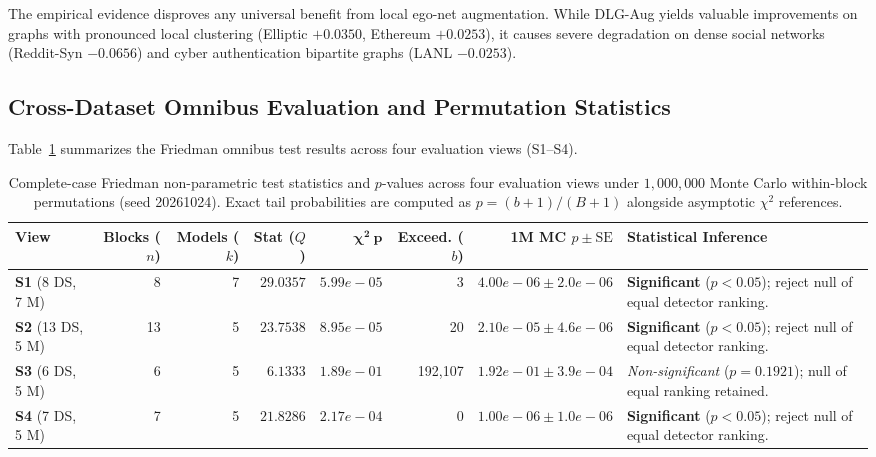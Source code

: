 \documentclass[applsci,article,submit,moreauthors,pdftex]{Definitions/mdpi}
\begin{document}
The empirical evidence disproves any universal benefit from local ego-net augmentation. While DLG-Aug yields valuable improvements on graphs with pronounced local clustering (Elliptic $+0.0350$, Ethereum $+0.0253$), it causes severe degradation on dense social networks (Reddit-Syn $-0.0656$) and cyber authentication bipartite graphs (LANL $-0.0253$).

\subsection{Cross-Dataset Omnibus Evaluation and Permutation Statistics}
Table~\ref{tab:friedman_stats} summarizes the Friedman omnibus test results across four evaluation views (S1--S4).

\begin{table}[htbp]
\centering\footnotesize\setlength{\tabcolsep}{3.0pt}
\caption{Complete-case Friedman non-parametric test statistics and $p$-values across four evaluation views under $1{,}000{,}000$ Monte Carlo within-block permutations (seed 20261024). Exact tail probabilities are computed as $p = (b+1)/(B+1)$ alongside asymptotic $\chi^2$ references.}
\label{tab:friedman_stats}
\begin{tabularx}{\textwidth}{lrrrrrr>{\raggedright\arraybackslash}X}\toprule
\textbf{View} & \textbf{Blocks ($n$)} & \textbf{Models ($k$)} & \textbf{Stat ($Q$)} & $\mathbf{\chi^2\ p}$ & \textbf{Exceed. ($b$)} & \textbf{1M MC $p \pm \text{SE}$} & \textbf{Statistical Inference} \\\midrule
\textbf{S1} (8 DS, 7 M) & 8 & 7 & $29.0357$ & $5.99e-05$ & 3 & $4.00e-06 \pm 2.0e-06$ & \textbf{Significant} ($p < 0.05$); reject null of equal detector ranking. \\
\textbf{S2} (13 DS, 5 M) & 13 & 5 & $23.7538$ & $8.95e-05$ & 20 & $2.10e-05 \pm 4.6e-06$ & \textbf{Significant} ($p < 0.05$); reject null of equal detector ranking. \\
\textbf{S3} (6 DS, 5 M) & 6 & 5 & $6.1333$ & $1.89e-01$ & 192,107 & $1.92e-01 \pm 3.9e-04$ & \textit{Non-significant} ($p = 0.1921$); null of equal ranking retained. \\
\textbf{S4} (7 DS, 5 M) & 7 & 5 & $21.8286$ & $2.17e-04$ & 0 & $1.00e-06 \pm 1.0e-06$ & \textbf{Significant} ($p < 0.05$); reject null of equal detector ranking. \\
\bottomrule
\end{tabularx}
\end{table}
\end{document}
